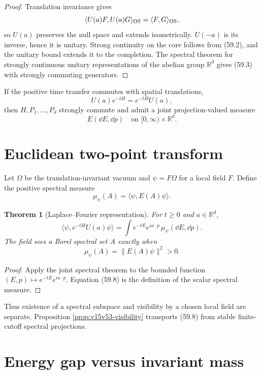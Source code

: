 \documentclass[11pt]{article}
\newtheorem{theorem}{Theorem}[section]
\theoremstyle{remark}
\begin{document}
\begin{proof}
Translation invariance gives
\[
 \langle U(a)F,U(a)G\rangle_{\rm OS}
 =\langle F,G\rangle_{\rm OS},
\]
so \(U(a)\) preserves the null space and extends isometrically.
\(U(-a)\) is its inverse, hence it is unitary.  Strong continuity on
the core follows from (59.2), and the unitary bound extends it to
the completion.  The spectral theorem for strongly continuous
unitary representations of the abelian group \(\mathbb R^d\) gives
(59.3) with strongly commuting generators.
\end{proof}

If the positive time transfer commutes with spatial translations,
\[
 U(a)e^{-tH}=e^{-tH}U(a),                               \tag{59.4}
\]
then \(H,P_1,\ldots,P_d\) strongly commute and admit a joint
projection-valued measure
\[
 E(\dd E,\dd p)
 \quad\text{on }[0,\infty)\times\mathbb R^d.            \tag{59.5}
\]

\section{Euclidean two-point transform}

Let \(\Omega\) be the translation-invariant vacuum and
\(\psi=F\Omega\) for a local field \(F\).  Define the positive
spectral measure
\[
 \mu_\psi(A)=\langle\psi,E(A)\psi\rangle.               \tag{59.6}
\]

\begin{theorem}[Laplace--Fourier representation]
\label{thm:v15v59-two-point}
For \(t\geq0\) and \(a\in\mathbb R^d\),
\[
 \boxed{
 \langle\psi,e^{-tH}U(a)\psi\rangle
 =
 \int e^{-tE}e^{ia\cdot p}\,
       \mu_\psi(\dd E,\dd p).}                           \tag{59.7}
\]
The field sees a Borel spectral set \(A\) exactly when
\[
 \mu_\psi(A)=\|E(A)\psi\|^2>0.                          \tag{59.8}
\]
\end{theorem}

\begin{proof}
Apply the joint spectral theorem to the bounded function
\((E,p)\mapsto e^{-tE}e^{ia\cdot p}\).  Equation (59.8) is the
definition of the scalar spectral measure.
\end{proof}

Thus existence of a spectral subspace and visibility by a chosen
local field are separate.  Proposition
\ref{prop:v15v53-visibility} transports (59.8) from stable
finite-cutoff spectral projections.

\section{Energy gap versus invariant mass}
\end{document}
